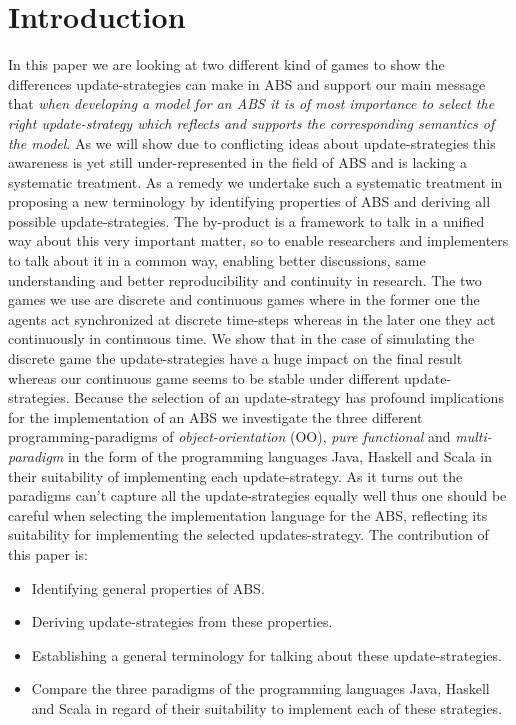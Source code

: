 \section{Introduction}
In this paper we are looking at two different kind of games to show the differences update-strategies can make in ABS and support our main message that \textit{when developing a model for an ABS it is of most importance to select the right update-strategy which reflects and supports the corresponding semantics of the model}. As we will show due to conflicting ideas about update-strategies this awareness is yet still under-represented in the field of ABS and is lacking a systematic treatment. As a remedy we undertake such a systematic treatment in proposing a new terminology by identifying properties of ABS and deriving all possible update-strategies. The by-product is a framework to talk in a unified way about this very important matter, so to enable researchers and implementers to talk about it in a common way, enabling better discussions, same understanding and better reproducibility and continuity in research.
The two games we use are discrete and continuous games where in the former one the agents act synchronized at discrete time-steps whereas in the later one they act continuously in continuous time. We show that in the case of simulating the discrete game the update-strategies have a huge impact on the final result whereas our continuous game seems to be stable under different update-strategies.
Because the selection of an update-strategy has profound implications for the implementation of an ABS we investigate the three different programming-paradigms of \textit{object-orientation} (OO), \textit{pure functional} and \textit{multi-paradigm} in the form of the programming languages Java, Haskell and Scala in their suitability of implementing each update-strategy. As it turns out the paradigms can't capture all the update-strategies equally well thus one should be careful when selecting the implementation language for the ABS, reflecting its suitability for implementing the selected updates-strategy. The contribution of this paper is:
\begin{itemize}
	\item Identifying general properties of ABS.
	\item Deriving update-strategies from these properties.
	\item Establishing a general terminology for talking about these update-strategies.
	\item Compare the three paradigms of the programming languages Java, Haskell and Scala in regard of their suitability to implement each of these strategies.
\end{itemize}